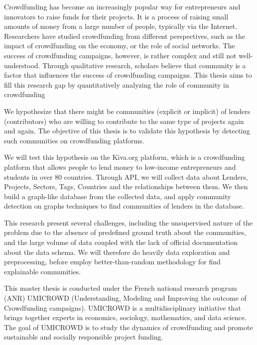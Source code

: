 Crowdfunding has become an increasingly popular way for entrepreneurs and innovators to raise funds for their projects.
It is a process of raising small amounts of money from a large number of people, typically via the Internet.
Researchers have studied crowdfunding from different perspectives, such as the impact of crowdfunding on the economy, or the role of social networks.
The success of crowdfunding campaigns, however, is rather complex and still not well-understood.
Through qualitative research, scholars believe that community is a factor that influences the success of crowdfunding campaigns.
This thesis aims to fill this research gap by quantitatively analyzing the role of community in crowdfunding

We hypothesize that there might be communities (explicit or implicit) of lenders (contributors) who are willing to contribute to the same type of projects again and again.
The objective of this thesis is  to validate this hypothesis by detecting such communities on crowdfunding platforms.

We will test this hypothesis on the Kiva.org platform,
which is a crowdfunding platform that allows people to lend money to low-income entrepreneurs and students in over 80 countries.
Through API, we will collect data about Lenders, Projects, Sectors, Tags, Countries and the relationships between them.
We then build a graph-like database from the collected data,
and apply community detection on graphs techniques to find communities of lenders in the database.

This research present several challenges, including the unsupervised nature of the problem
due to the absence of predefined ground truth about the communities,
and the large volume of data coupled with the lack of official documentation about the data schema.
We will therefore do heavily data exploration and preprocessing,
before employ better-than-random methodology for find explainable communities.

This master thesis is conducted under the French national research program (ANR) UMICROWD (Understanding, Modeling and Improving the outcome of Crowdfunding campaigns).
UMICROWD is a multidisciplinary initiative that brings together experts in economics, sociology, mathematics, and data science.
The goal of UMICROWD is to study the dynamics of crowdfunding and promote sustainable and socially responsible project funding.


